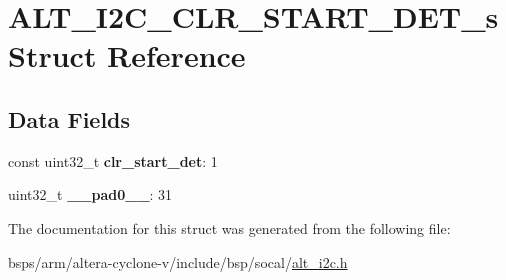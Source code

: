 \hypertarget{structALT__I2C__CLR__START__DET__s}{}\section{A\+L\+T\+\_\+\+I2\+C\+\_\+\+C\+L\+R\+\_\+\+S\+T\+A\+R\+T\+\_\+\+D\+E\+T\+\_\+s Struct Reference}
\label{structALT__I2C__CLR__START__DET__s}
\subsection*{Data Fields}
\begin{DoxyCompactItemize}
\item 
\mbox{\label{structALT__I2C__CLR__START__DET__s_a30be44fba274c937fea9365c636d6a6e}} 
const uint32\+\_\+t {\bfseries clr\+\_\+start\+\_\+det}\+: 1
\item 
\mbox{\label{structALT__I2C__CLR__START__DET__s_aaccc88f23f1571cec1f8ab919df6f7b6}} 
uint32\+\_\+t {\bfseries \+\_\+\+\_\+pad0\+\_\+\+\_\+}\+: 31
\end{DoxyCompactItemize}


The documentation for this struct was generated from the following file\+:\begin{DoxyCompactItemize}
\item 
bsps/arm/altera-\/cyclone-\/v/include/bsp/socal/\mbox{\hyperlink{socal_2alt__i2c_8h}{alt\+\_\+i2c.\+h}}\end{DoxyCompactItemize}
